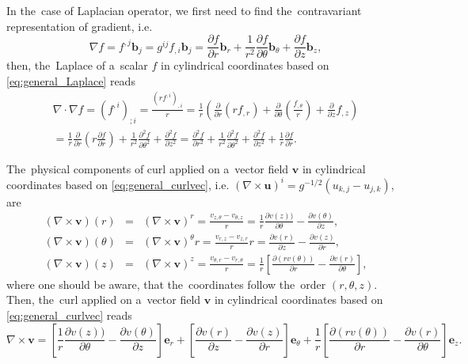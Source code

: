 \documentclass[preprint,12pt]{elsarticle}
\newcommand{\pdv}[2]{\frac{\partial{#1}}{\partial{#2}}}
\newcommand{\vect}[1]{\boldsymbol{#1}}
\newcounter{bla}
\begin{document}
In the~case of Laplacian operator, we first need to find the~contravariant 
representation of gradient, i.e.
\begin{equation}
  \nabla f = f^{,j}\vect{b}_j = g^{ij} f_{,i}\vect{b}_j 
  = \pdv{f}{r}\vect{b}_r 
  + \frac{1}{r^2}\pdv{f}{\theta}\vect{b}_{\theta}
  + \pdv{f}{z}\vect{b}_z ,
  \nonumber
\end{equation}
then, the~Laplace of a~scalar $f$ in cylindrical coordinates based on
\eqref{eq:general_Laplace} reads
\begin{multline}
  \nabla\cdot\nabla f = (f^{,i})_{;i} = 
  \frac{(r f^{,i})_{,i}}{r} 
  = \frac{1}{r}\left( \pdv{}{r}\left(r f_{,r} \right) 
  + \pdv{}{\theta}\left(\frac{f_{,\theta}}{r}\right)
  + \pdv{}{z} f_{,z} \right) \\
  = \frac{1}{r}\pdv{}{r}\left(r\pdv{f}{r} \right) 
  + \frac{1}{r^2} \frac{\partial^2 f}{\partial\theta^2}
  + \frac{\partial^2 f}{\partial z^2}
  =  \frac{\partial^2 f}{\partial r^2}
  + \frac{1}{r^2} \frac{\partial^2 f}{\partial\theta^2}
  + \frac{\partial^2 f}{\partial z^2} + \frac{1}{r}\pdv{f}{r} .
  \label{eq:cyl_Laplacef}
\end{multline}

The~physical components of curl applied on a~vector field $\vect{v}$ 
in cylindrical coordinates based on \eqref{eq:general_curlvec}, 
i.e. $(\nabla\times\vect{u})^i = g^{-1/2} (u_{k,j} - u_{j,k})$, are
\begin{eqnarray}
  (\nabla\times\vect{v})(r) &=& (\nabla\times\vect{v})^r 
  = \frac{v_{z, \theta} - v_{\theta, z}}{r} 
  = \frac{1}{r} \pdv{v(z))}{\theta} - \pdv{v(\theta)}{z} , 
  \nonumber \\
  (\nabla\times\vect{v})(\theta) &=& (\nabla\times\vect{v})^\theta r 
  = \frac{v_{r,z} - v_{z,r}}{r} r  
  = \pdv{v(r)}{z} - \pdv{v(z)}{r} , 
  \nonumber \\
  (\nabla\times\vect{v})(z) &=& (\nabla\times\vect{v})^z 
  = \frac{v_{\theta,r} - v_{r, \theta}}{r} 
  = \frac{1}{r}
  \left[\pdv{(r v(\theta))}{r} 
  - \pdv{v(r)}{\theta} \right] , \nonumber
\end{eqnarray}
where one should be aware, that the~coordinates follow the~order 
$(r, \theta, z)$.
Then, the~curl applied on a~vector field $\vect{v}$ in cylindrical coordinates 
based on \eqref{eq:general_curlvec} reads
\begin{equation}
  \nabla\times\vect{v} = 
  \left[ \frac{1}{r} \pdv{v(z))}{\theta} - \pdv{v(\theta)}{z} \right] 
  \vect{e}_r
  + \left[ \pdv{v(r)}{z} - \pdv{v(z)}{r} \right] \vect{e}_\theta
  + \frac{1}{r} \left[\pdv{(r v(\theta))}{r} - \pdv{v(r)}{\theta} \right] 
  \vect{e}_z .
  \label{eq:cyl_curlvec}
\end{equation}
\end{document}
